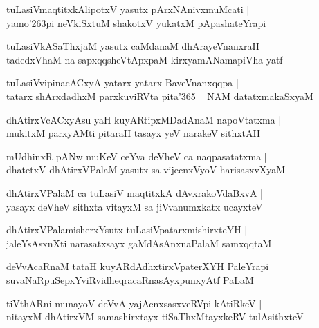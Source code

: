 \documentclass[twoside,12pt,openright]{book}
\def\S{\char'263}
\newcounter{shloka}[chapter]
\begin{document}
\begin{shloka}%
tuLasiVmaqtitxkAlipotxV yasutx pArxNAnivxmuMcati |\\
yamo\S pi neVkiSxtuM shakotxV yukatxM pApashateYrapi
\end{shloka}

\begin{shloka}%
tuLasiVkASaThxjaM yasutx caMdanaM dhArayeVnanxraH |\\
tadedxVhaM na sapxqqsheVtApxpaM kirxyamANamapiVha yatf 
\end{shloka}

\begin{shloka}%
tuLasiVvipinacACxyA yatarx yatarx BaveVnanxqqpa |\\
tatarx shArxdadhxM parxkuviRVta pita\char'365 ~ NAM datatxmakaSxyaM 
\end{shloka}

\begin{shloka}%
dhAtirxVcACxyAsu yaH kuyARtipxMDadAnaM napoVtatxma |\\
mukitxM parxyAMti pitaraH tasayx yeV narakeV sithxtAH 
\end{shloka}

\begin{shloka}%
mUdhinxR pANw muKeV ceYva deVheV ca naqpasatatxma |\\
dhatetxV dhAtirxVPalaM yasutx sa vijecnxVyoV harisasxvXyaM 
\end{shloka}

\begin{shloka}%
dhAtirxVPalaM ca tuLasiV maqtitxkA dAvxrakoVdaBxvA |\\
yasayx deVheV sithxta vitayxM sa jiVvanumxkatx ucayxteV
\end{shloka}

\begin{shloka}%
dhAtirxVPalamisherxYsutx tuLasiVpatarxmishirxteYH |\\
jaleYsAsxnXti narasatxsayx gaMdAsAnxnaPalaM samxqqtaM 
\end{shloka}

\begin{shloka}%
deVvAcaRnaM tataH kuyARdAdhxtirxVpaterXYH PaleYrapi |\\
suvaNaRpuSepxYviRvidheqracaRnasAyxpunxyAtf PaLaM 
\end{shloka}

\begin{shloka}%
tiVthARni munayoV deVvA yajAcnxsasxveRVpi kAtiRkeV |\\
nitayxM dhAtirxVM samashirxtayx tiSaThxMtayxkeRV tulAsithxteV
\end{shloka}
\end{document}
